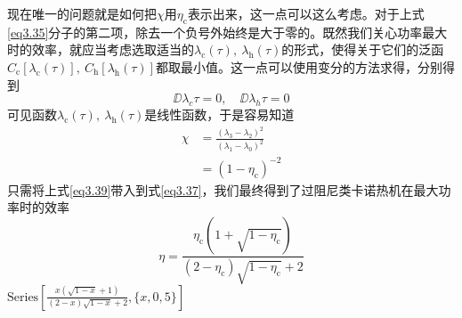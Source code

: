 现在唯一的问题就是如何把$\chi$用$\eta_{\mathrm{c}}$表示出来，这一点可以这么考虑。对于上式\eqref{eq3.35}分子的第二项，除去一个负号外始终是大于零的。既然我们关心功率最大时的效率，就应当考虑选取适当的$\lambda_{\mathrm{c}}(\tau),\ \lambda_{\mathrm{h}}(\tau)$的形式，使得关于它们的泛函$C_{\mathrm{c}} [\lambda_{\mathrm{c}}(\tau)],\ C_{\mathrm{h}} [\lambda_{\mathrm{h}}(\tau)]$都取最小值。这一点可以使用变分的方法求得，分别得到
\begin{equation}
    \DD{\lambda_{c}}{\tau}=0,\quad \DD{\lambda_{h}}{\tau}=0
    \label{eq3.38}
\end{equation}
可见函数$\lambda_{\mathrm{c}}(\tau),\ \lambda_{\mathrm{h}}(\tau)$是线性函数，于是容易知道
\begin{equation}
    \begin{split}
        \chi&=\frac{{\left(\lambda_3 - \lambda_2\right)}^2}{{\left(\lambda_1 - \lambda_0\right)}^2}\\
        &= {(1-\eta_{\mathrm{c}})}^{-2}
    \end{split}
    \label{eq3.39}
\end{equation}
只需将上式\eqref{eq3.39}带入到式\eqref{eq3.37}，我们最终得到了过阻尼类卡诺热机在最大功率时的效率
\begin{equation}
    \eta=\frac{\eta_{\mathrm{c}}\left(1+\sqrt{1-\eta_{\mathrm{c}}}\right)}{\left(2-\eta_{\mathrm{c}}\right) \sqrt{1-\eta_{\mathrm{c}}}+2}
    \label{eq3.40}
\end{equation}
$\text{Series}\left[\frac{x \left(\sqrt{1-x}+1\right)}{(2-x) \sqrt{1-x}+2},\{x,0,5\}\right]$


